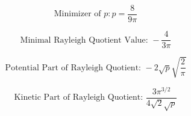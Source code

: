 \begin{equation}
	\text{Minimizer of } p: p = \frac{8}{9\pi}
\end{equation}

\begin{equation}
	\text{Minimal Rayleigh Quotient Value: } -\frac{4}{3\pi}
\end{equation}

\begin{equation}
	\text{Potential Part of Rayleigh Quotient: } -2\sqrt{p} \sqrt{\frac{2}{\pi}}
\end{equation}

\begin{equation}
	\text{Kinetic Part of Rayleigh Quotient: } \frac{3 \pi^{3/2}}{4 \sqrt{2} \sqrt{p}}
\end{equation}
